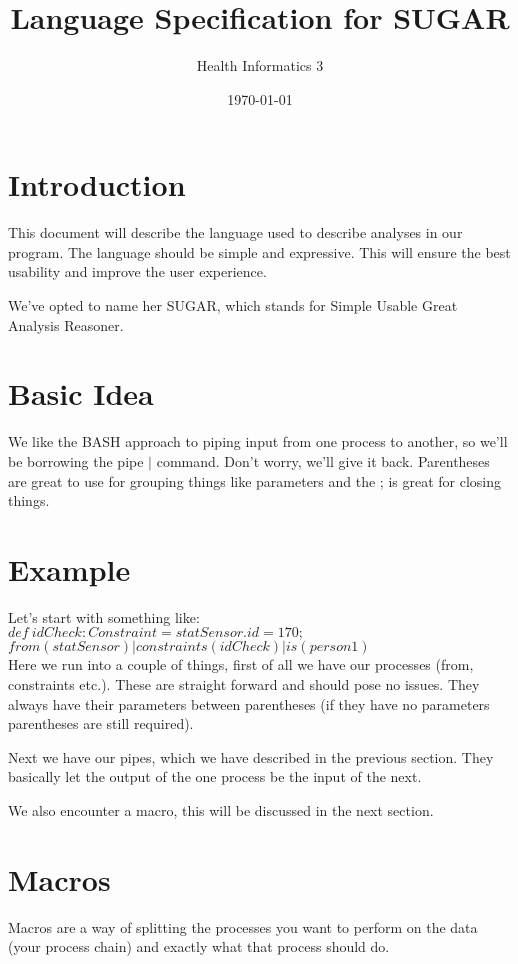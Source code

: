 \documentclass[a4paper]{article}
\title{Language Specification for SUGAR}
\author{Health Informatics 3}
\date{\today}
\begin{document}
\maketitle


\section{Introduction}
This document will describe the language used to describe analyses in our program. The language should be simple and expressive. This will ensure the best usability and improve the user experience. 

We've opted to name her SUGAR, which stands for Simple Usable Great Analysis Reasoner. 

\section{Basic Idea}
We like the BASH approach to piping input from one process to another, so we'll be borrowing the pipe $|$ command. Don't worry, we'll give it back. Parentheses are great to use for grouping things like parameters and the ; is great for closing things.

\section{Example}
Let's start with something like:\\

$def\ idCheck : Constraint = statSensor.id = 170;$ \\
$from(statSensor)|constraints(idCheck)|is(person1)$\\

Here we run into a couple of things, first of all we have our processes (from, constraints etc.). These are straight forward and should pose no issues. They always have their parameters between parentheses (if they have no parameters parentheses are still required). 

Next we have our pipes, which we have described in the previous section. They basically let the output of the one process be the input of the next.

We also encounter a macro, this will be discussed in the next section.


\section{Macros}
Macros are a way of splitting the processes you want to perform on the data (your process chain) and exactly what that process should do.
\end{document}

